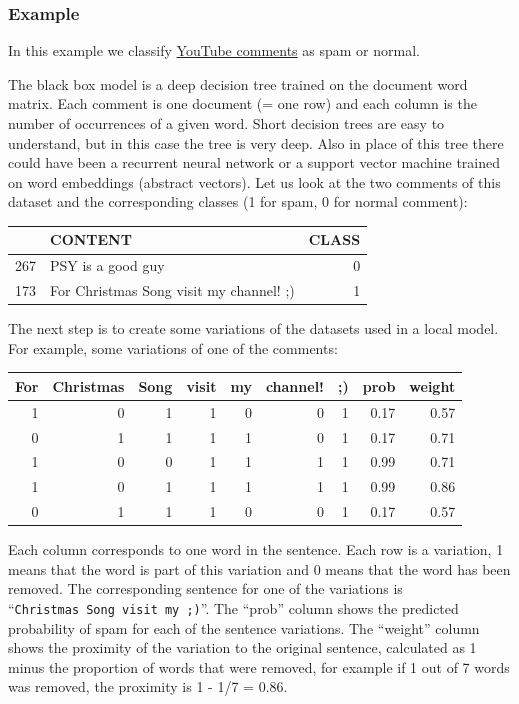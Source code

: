 \documentclass[12pt,]{krantz}
\begin{document}
\subsubsection{Example}\label{example-6}

In this example we classify \protect\hyperlink{spam-data}{YouTube
comments} as spam or normal.

The black box model is a deep decision tree trained on the document word
matrix. Each comment is one document (= one row) and each column is the
number of occurrences of a given word. Short decision trees are easy to
understand, but in this case the tree is very deep. Also in place of
this tree there could have been a recurrent neural network or a support
vector machine trained on word embeddings (abstract vectors). Let us
look at the two comments of this dataset and the corresponding classes
(1 for spam, 0 for normal comment):

\begin{tabular}{l|l|r}
\hline
  & CONTENT & CLASS\\
\hline
267 & PSY is a good guy & 0\\
\hline
173 & For Christmas Song visit my channel! ;) & 1\\
\hline
\end{tabular}

The next step is to create some variations of the datasets used in a
local model. For example, some variations of one of the comments:

\begin{tabular}{r|r|r|r|r|r|r|r|r}
\hline
For & Christmas & Song & visit & my & channel! & ;) & prob & weight\\
\hline
1 & 0 & 1 & 1 & 0 & 0 & 1 & 0.17 & 0.57\\
\hline
0 & 1 & 1 & 1 & 1 & 0 & 1 & 0.17 & 0.71\\
\hline
1 & 0 & 0 & 1 & 1 & 1 & 1 & 0.99 & 0.71\\
\hline
1 & 0 & 1 & 1 & 1 & 1 & 1 & 0.99 & 0.86\\
\hline
0 & 1 & 1 & 1 & 0 & 0 & 1 & 0.17 & 0.57\\
\hline
\end{tabular}

Each column corresponds to one word in the sentence. Each row is a
variation, 1 means that the word is part of this variation and 0 means
that the word has been removed. The corresponding sentence for one of
the variations is ``\texttt{Christmas\ Song\ visit\ my\ ;)}''. The
``prob'' column shows the predicted probability of spam for each of the
sentence variations. The ``weight'' column shows the proximity of the
variation to the original sentence, calculated as 1 minus the proportion
of words that were removed, for example if 1 out of 7 words was removed,
the proximity is 1 - 1/7 = 0.86.
\end{document}
